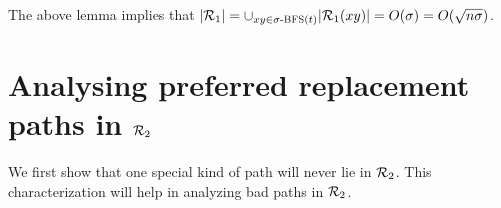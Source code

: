 \noindent The above lemma implies that $|\mathcal{R}_1| = \cup_{xy \in \text{$\sigma$-\textsc{BFS}($t$)}} |\mathcal{R}_1(xy)| =
O(\sigma) = O(\sqrt{n \sigma})$.




%
\iflong
\else
\vspace{-2mm}
\fi
\section{Analysing preferred replacement paths in $\mathcal{R}_2$}
\label{sec:multi2}


We first show that one special kind of path will never lie in $\mathcal{R}_2$.
This characterization will help in analyzing bad paths in $\mathcal{R}_2$.


